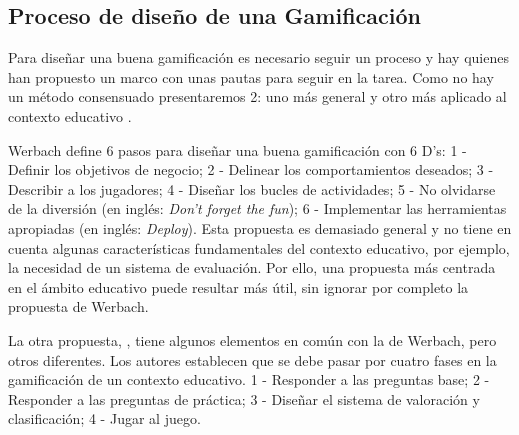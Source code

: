 

\subsection{Proceso de diseño de una Gamificación}

Para diseñar una buena gamificación es necesario seguir un proceso y hay quienes han propuesto un marco con unas pautas para seguir en la tarea. 
%
Como no hay un método consensuado presentaremos 2: uno más general  \citep{werbach2012win} y otro más aplicado al contexto educativo  \citep*{kapp2013gamification}.

Werbach define 6 pasos para diseñar una buena gamificación con 6 D's: 
1 - Definir los objetivos de negocio; 2 - Delinear los comportamientos deseados; 3 - Describir a los jugadores; 4 - Diseñar los bucles de actividades; 5 - No olvidarse de la diversión (en inglés: \textit{Don't forget the fun}); 6 - Implementar las herramientas apropiadas (en inglés: \textit{Deploy}).
%
Esta propuesta es demasiado general y no tiene en cuenta algunas características fundamentales del contexto educativo, por ejemplo, la necesidad de un sistema de evaluación.
%
Por ello, una propuesta más centrada en el ámbito educativo puede resultar más útil, sin ignorar por completo la propuesta de Werbach.

La otra propuesta,  \cite{kapp2013gamification}, tiene algunos elementos en común con la de Werbach, pero otros diferentes. 
%
Los autores establecen que se debe pasar por cuatro fases en la gamificación de un contexto educativo. 1 - Responder a las preguntas base; 2 - Responder a las preguntas de práctica; 3 - Diseñar el sistema de valoración y clasificación; 4 - Jugar al juego.

